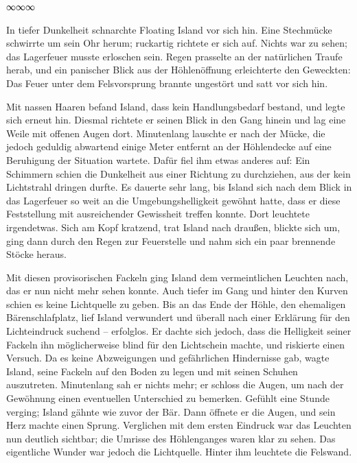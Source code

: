 \begin{center}
∞∞∞
\end{center}

In tiefer Dunkelheit schnarchte Floating Island vor sich hin. Eine Stechmücke schwirrte um sein Ohr herum; ruckartig richtete er sich auf. Nichts war zu sehen; das Lagerfeuer musste erloschen sein. Regen prasselte an der natürlichen Traufe herab, und ein panischer Blick aus der Höhlenöffnung erleichterte den Geweckten: Das Feuer unter dem Felsvorsprung brannte ungestört und satt vor sich hin.

Mit nassen Haaren befand Island, dass kein Handlungsbedarf bestand, und legte sich erneut hin. Diesmal richtete er seinen Blick in den Gang hinein und lag eine Weile mit offenen Augen dort. Minutenlang lauschte er nach der Mücke, die jedoch geduldig abwartend einige Meter entfernt an der Höhlendecke auf eine Beruhigung der Situation wartete. Dafür fiel ihm etwas anderes auf: Ein Schimmern schien die Dunkelheit aus einer Richtung zu durchziehen, aus der kein Lichtstrahl dringen durfte. Es dauerte sehr lang, bis Island sich nach dem Blick in das Lagerfeuer so weit an die Umgebungshelligkeit gewöhnt hatte, dass er diese Feststellung mit ausreichender Gewissheit treffen konnte. Dort leuchtete irgendetwas. Sich am Kopf kratzend, trat Island nach draußen, blickte sich um, ging dann durch den Regen zur Feuerstelle und nahm sich ein paar brennende Stöcke heraus.

Mit diesen provisorischen Fackeln ging Island dem vermeintlichen Leuchten nach, das er nun nicht mehr sehen konnte. Auch tiefer im Gang und hinter den Kurven schien es keine Lichtquelle zu geben. Bis an das Ende der Höhle, den ehemaligen Bärenschlafplatz, lief Island verwundert und überall nach einer Erklärung für den Lichteindruck suchend – erfolglos. Er dachte sich jedoch, dass die Helligkeit seiner Fackeln ihn möglicherweise blind für den Lichtschein machte, und riskierte einen Versuch. Da es keine Abzweigungen und gefährlichen Hindernisse gab, wagte Island, seine Fackeln auf den Boden zu legen und mit seinen Schuhen auszutreten. Minutenlang sah er nichts mehr; er schloss die Augen, um nach der Gewöhnung einen eventuellen Unterschied zu bemerken. Gefühlt eine Stunde verging; Island gähnte wie zuvor der Bär. Dann öffnete er die Augen, und sein Herz machte einen Sprung. Verglichen mit dem ersten Eindruck war das Leuchten nun deutlich sichtbar; die Umrisse des Höhlenganges waren klar zu sehen. Das eigentliche Wunder war jedoch die Lichtquelle. Hinter ihm leuchtete die Felswand.

